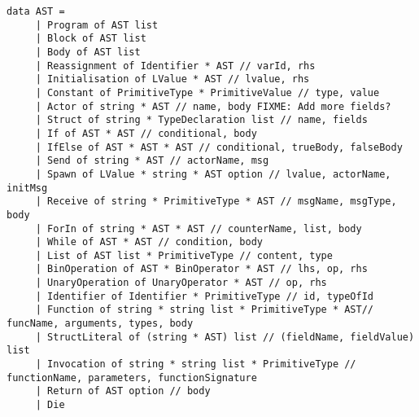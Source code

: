 \begin{lstlisting}[style = fsharp, label = lst:ast_listing, caption = {Data type of AST used throughout the compiler}]
data AST = 
     | Program of AST list
     | Block of AST list
     | Body of AST list
     | Reassignment of Identifier * AST // varId, rhs
     | Initialisation of LValue * AST // lvalue, rhs
     | Constant of PrimitiveType * PrimitiveValue // type, value
     | Actor of string * AST // name, body FIXME: Add more fields?
     | Struct of string * TypeDeclaration list // name, fields
     | If of AST * AST // conditional, body
     | IfElse of AST * AST * AST // conditional, trueBody, falseBody
     | Send of string * AST // actorName, msg
     | Spawn of LValue * string * AST option // lvalue, actorName, initMsg
     | Receive of string * PrimitiveType * AST // msgName, msgType, body
     | ForIn of string * AST * AST // counterName, list, body
     | While of AST * AST // condition, body
     | List of AST list * PrimitiveType // content, type
     | BinOperation of AST * BinOperator * AST // lhs, op, rhs
     | UnaryOperation of UnaryOperator * AST // op, rhs
     | Identifier of Identifier * PrimitiveType // id, typeOfId
     | Function of string * string list * PrimitiveType * AST// funcName, arguments, types, body
     | StructLiteral of (string * AST) list // (fieldName, fieldValue) list
     | Invocation of string * string list * PrimitiveType // functionName, parameters, functionSignature
     | Return of AST option // body
     | Die
\end{lstlisting}
